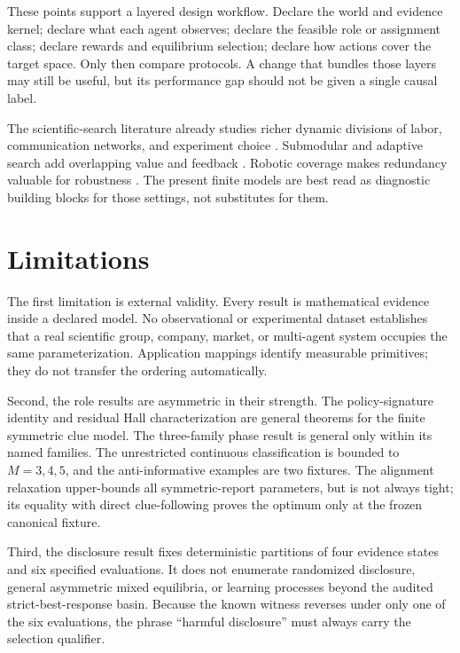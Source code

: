 \documentclass[11pt]{article}
\theoremstyle{remark}
\begin{document}
These points support a layered design workflow. Declare the world and evidence
kernel; declare what each agent observes; declare the feasible role or assignment
class; declare rewards and equilibrium selection; declare how actions cover the
target space. Only then compare protocols. A change that bundles those layers may
still be useful, but its performance gap should not be given a single causal
label.

The scientific-search literature already studies richer dynamic divisions of
labor, communication networks, and experiment choice
\citep{March1991,Kitcher1990,Zollman2007,RzhetskyEtAl2015}. Submodular and adaptive
search add overlapping value and feedback \citep{NemhauserEtAl1978,
GolovinKrause2011}. Robotic coverage makes redundancy valuable for robustness
\citep{HazonKaminka2008}. The present finite models are best read as diagnostic
building blocks for those settings, not substitutes for them.

\section{Limitations}
The first limitation is external validity. Every result is mathematical evidence
inside a declared model. No observational or experimental dataset establishes
that a real scientific group, company, market, or multi-agent system occupies the
same parameterization. Application mappings identify measurable primitives; they
do not transfer the ordering automatically.

Second, the role results are asymmetric in their strength. The policy-signature
identity and residual Hall characterization are general theorems for the finite
symmetric clue model. The three-family phase result is general only within its
named families. The unrestricted continuous classification is bounded to
$M=3,4,5$, and the anti-informative examples are two fixtures. The alignment
relaxation upper-bounds all symmetric-report parameters, but is not always tight;
its equality with direct clue-following proves the optimum only at the frozen
canonical fixture.

Third, the disclosure result fixes deterministic partitions of four evidence
states and six specified evaluations. It does not enumerate randomized disclosure,
general asymmetric mixed equilibria, or learning processes beyond the audited
strict-best-response basin. Because the known witness reverses under only one of
the six evaluations, the phrase ``harmful disclosure'' must always carry the
selection qualifier.
\end{document}
